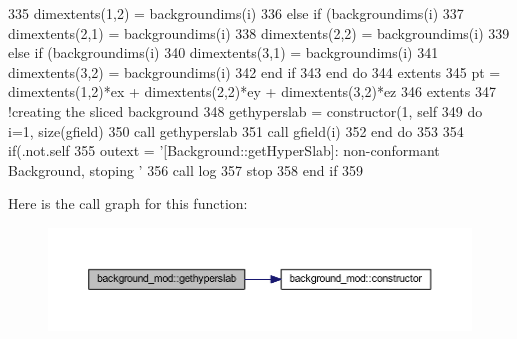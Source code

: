 \begin{DoxyCode}
335             dimextents(1,2) = backgroundims(i)%
336         \textcolor{keywordflow}{else} \textcolor{keywordflow}{if} (backgroundims(i)%
337             dimextents(2,1) = backgroundims(i)%
338             dimextents(2,2) = backgroundims(i)%
339         \textcolor{keywordflow}{else} \textcolor{keywordflow}{if} (backgroundims(i)%
340             dimextents(3,1) = backgroundims(i)%
341             dimextents(3,2) = backgroundims(i)%
342 \textcolor{keywordflow}{        end if}
343 \textcolor{keywordflow}{    end do}
344     extents%
345     pt = dimextents(1,2)*ex + dimextents(2,2)*ey + dimextents(3,2)*ez
346     extents%
347     \textcolor{comment}{!creating the sliced background}
348     gethyperslab = constructor(1, self%
349     \textcolor{keywordflow}{do} i=1, \textcolor{keyword}{size}(gfield)
350         \textcolor{keyword}{call }gethyperslab%
351         \textcolor{keyword}{call }gfield(i)%
352 \textcolor{keywordflow}{    end do}
353 
354     \textcolor{keywordflow}{if}(.not.self%
355         outext = \textcolor{stringliteral}{'[Background::getHyperSlab]: non-conformant Background, stoping '}
356         \textcolor{keyword}{call }log%
357         stop
358 \textcolor{keywordflow}{    end if}
359 
\end{DoxyCode}
Here is the call graph for this function\+:\nopagebreak
\begin{figure}[H]
\begin{center}
\leavevmode
\includegraphics[width=350pt]{namespacebackground__mod_ae26fda3baab915148ec5749d1eda2ea6_cgraph}
\end{center}
\end{figure}
\mbox{\label{namespacebackground__mod_ac799224ce7ad219bf1fb4f1f42508f45}} 
